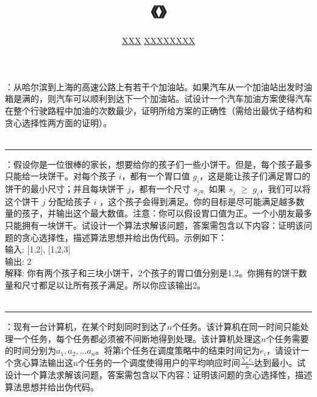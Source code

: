 \documentclass[UTF8,16pt]{article} %
\title{《\heiti{算法设计与分析}》\heiti{第{\color{red}4}次作业}}
\author{\kaishu{姓名：}\underline{XXX} \quad\quad\quad\quad\quad  \kaishu{学号：}\underline{XXXXXXXX}}
\date{}
\begin{document}
	
\maketitle
\vbox{} %

：从哈尔滨到上海的高速公路上有若干个加油站。如果汽车从一个加油站出发时油箱是满的，则汽车可以顺利到达下一个加油站。试设计一个汽车加油方案使得汽车在整个行驶路程中加油的次数最少，证明所给方案的正确性（需给出最优子结构和贪心选择性两方面的证明）。\\
{}\\
\rule[0pt]{14.3cm}{0.05em}

\vbox{} %
：假设你是一位很棒的家长，想要给你的孩子们一些小饼干。但是，每个孩子最多只能给一块饼干。对每个孩子 $i$，都有一个胃口值 $g_{i}$，这是能让孩子们满足胃口的饼干的最小尺寸；并且每块饼干 $j$，都有一个尺寸 $s_{j}$。如果 $s_{j}$ $\ge$ $g_{i}$，我们可以将这个饼干 $j$ 分配给孩子 $i$ ，这个孩子会得到满足。你的目标是尽可能满足越多数量的孩子，并输出这个最大数值。注意：你可以假设胃口值为正。一个小朋友最多只能拥有一块饼干。试设计一个算法求解该问题，答案需包含以下内容：证明该问题的贪心选择性，描述算法思想并给出伪代码。示例如下：\\
输入: [1,2], [1,2,3]\\
输出: 2\\
解释: 你有两个孩子和三块小饼干，2个孩子的胃口值分别是1,2。你拥有的饼干数量和尺寸都足以让所有孩子满足。所以你应该输出2。\\
{}\\
\rule[0pt]{14.3cm}{0.05em}

\vbox{} %
：现有一台计算机，在某个时刻同时到达了$n$个任务。该计算机在同一时间只能处理一个任务，每个任务都必须被不间断地得到处理。该计算机处理这$n$个任务需要的时间分别为$a_1, a_2,...a_n$。将第i个任务在调度策略中的结束时间记为$e_i$，请设计一个贪心算法输出这n个任务的一个调度使得用户的平均响应时间$\frac{\sum e_i}{n}$达到最小。试设计一个算法求解该问题，答案需包含以下内容：证明该问题的贪心选择性，描述算法思想并给出伪代码。\\
{}\\
\vbox{} %
\end{document}
